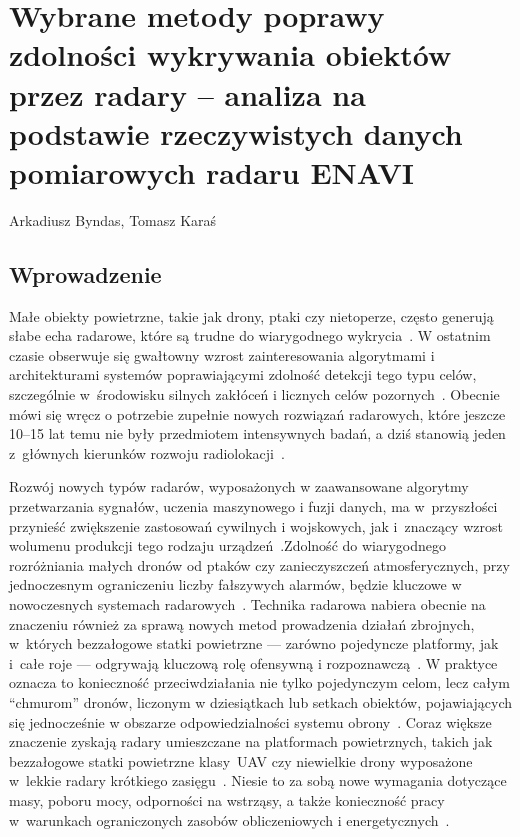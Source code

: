\chapter[Wybrane metody \ldots]{Wybrane metody poprawy zdolności wykrywania obiektów przez radary – analiza na podstawie rzeczywistych danych pomiarowych radaru ENAVI}
\thispagestyle{empty}
\vspace{-8mm} {\large Arkadiusz Byndas, Tomasz Karaś} \vspace{8mm}

\section{Wprowadzenie}
Małe obiekty powietrzne, takie jak drony, ptaki czy  nietoperze, często generują słabe echa radarowe, które są trudne do wiarygodnego wykrycia~\cite{Skolnik2008Radar,Pastorino2010MicrowaveImaging}. W ostatnim czasie obserwuje się gwałtowny wzrost zainteresowania algorytmami i architekturami systemów poprawiającymi zdolność detekcji tego typu celów, szczególnie w~środowisku silnych zakłóceń i licznych celów pozornych~\cite{Richards2014RadarSignalProcessing,HaykinRadarCognitive}. Obecnie mówi się wręcz o potrzebie zupełnie nowych rozwiązań radarowych, które jeszcze 10--15 lat temu nie były przedmiotem intensywnych badań, a dziś stanowią jeden z~głównych kierunków rozwoju radiolokacji~\cite{Cilliers2020CounterUAS,CUASsurvey2021}.

Rozwój nowych typów radarów, wyposażonych w zaawansowane algorytmy przetwarzania sygnałów, uczenia maszynowego i fuzji danych, ma w~przyszłości przynieść zwiększenie zastosowań cywilnych i wojskowych, jak i~znaczący wzrost wolumenu produkcji tego rodzaju urządzeń~\cite{Richards2014RadarSignalProcessing,HaykinRadarCognitive}.Zdolność do wiarygodnego rozróżniania małych dronów od ptaków czy zanieczyszczeń atmosferycznych, przy jednoczesnym ograniczeniu liczby fałszywych alarmów, będzie kluczowe w nowoczesnych systemach radarowych~\cite{CUASsurvey2021,WildlifeRadar2018}. Technika radarowa nabiera obecnie na znaczeniu również za sprawą nowych metod prowadzenia działań zbrojnych, w~których bezzałogowe statki powietrzne --- zarówno pojedyncze platformy, jak i~całe roje --- odgrywają kluczową rolę ofensywną  i rozpoznawczą~\cite{Cilliers2020CounterUAS,MilitaryUAVTrends2019}.
W praktyce oznacza to konieczność przeciwdziałania nie tylko  pojedynczym celom, lecz całym ``chmurom'' dronów, liczonym w dziesiątkach lub setkach obiektów, pojawiających się jednocześnie w obszarze odpowiedzialności systemu obrony~\cite{CUASsurvey2021}. Coraz większe znaczenie zyskają radary umieszczane na platformach powietrznych, takich jak bezzałogowe statki powietrzne klasy~UAV czy niewielkie drony wyposażone w~lekkie radary krótkiego zasięgu~\cite{UAVsenseAndAvoid2017,SmallRadarUAV2016}. Niesie to za sobą nowe wymagania dotyczące masy, poboru mocy, odporności na wstrząsy, a także konieczność pracy w~warunkach ograniczonych zasobów obliczeniowych i energetycznych~\cite{SmallRadarUAV2016}.

